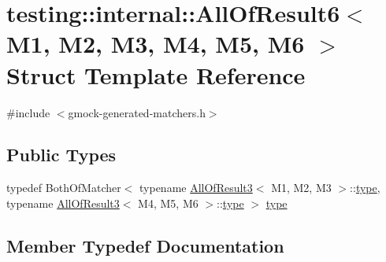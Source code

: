 \hypertarget{structtesting_1_1internal_1_1_all_of_result6}{}\section{testing\+::internal\+::All\+Of\+Result6$<$ M1, M2, M3, M4, M5, M6 $>$ Struct Template Reference}
\label{structtesting_1_1internal_1_1_all_of_result6}


{\ttfamily \#include $<$gmock-\/generated-\/matchers.\+h$>$}

\subsection*{Public Types}
\begin{DoxyCompactItemize}
\item 
typedef Both\+Of\+Matcher$<$ typename \mbox{\hyperlink{structtesting_1_1internal_1_1_all_of_result3}{All\+Of\+Result3}}$<$ M1, M2, M3 $>$\+::\mbox{\hyperlink{structtesting_1_1internal_1_1_all_of_result6_a5385655911ce2c1d3fccd802c1754139}{type}}, typename \mbox{\hyperlink{structtesting_1_1internal_1_1_all_of_result3}{All\+Of\+Result3}}$<$ M4, M5, M6 $>$\+::\mbox{\hyperlink{structtesting_1_1internal_1_1_all_of_result6_a5385655911ce2c1d3fccd802c1754139}{type}} $>$ \mbox{\hyperlink{structtesting_1_1internal_1_1_all_of_result6_a5385655911ce2c1d3fccd802c1754139}{type}}
\end{DoxyCompactItemize}


\subsection{Member Typedef Documentation}
\mbox{\label{structtesting_1_1internal_1_1_all_of_result6_a5385655911ce2c1d3fccd802c1754139}} 
